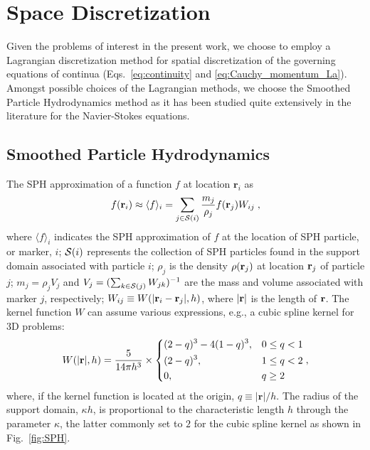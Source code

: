 \section{Space Discretization}\label{sec:Space-Discretization}
Given the problems of interest in the present work, we choose to employ a Lagrangian discretization method for spatial discretization of the governing equations of continua (Eqs.~\ref{eq:continuity} and \ref{eq:Cauchy_momentum_La}). Amongst possible choices of the Lagrangian methods, we choose the Smoothed Particle Hydrodynamics method as it has been studied quite extensively in the literature for the Navier-Stokes equations.
 
\subsection {Smoothed Particle Hydrodynamics}\label{sec:SPH}
The SPH  approximation of a function $f$ at location $\mathbf r_i$ as \cite{Monaghan2005a}
\begin{equation}\label{eq:SPH_f}
f(\mathbf r_i) \approx  \langle f\rangle_i= \sum_{j \in {{\mathcal{S}({i})}}} \frac{m_j}{\rho_j}f(\mathbf r_j)W_{ij} \; ,
\end{equation}
where $\langle f \rangle_i$ indicates the SPH approximation of $f$ at the location of SPH particle, or marker, $i$;  ${{\mathcal{S}({i})}}$ represents the collection of SPH particles found in the support domain associated with particle $i$; $\rho_j$ is the density $\rho({\bf r}_j)$ at location ${\bf r}_j$ of particle $j$; $m_j=\rho_j V_j$ and $V_j=(\sum_{k \in {\cal S}(j)} W_{jk})^{-1}$ are the mass and volume associated with marker $j$, respectively; $W_{ij}\equiv W(|\mathbf{r}_i-\mathbf{r}_j|,h)$, where $|{\bf r}|$ is the length of ${\bf r}$. The kernel function $W$ can assume various expressions, e.g., a cubic spline kernel for 3D problems:
\begin{equation} 
\label{eq:kernelExample}
W(|\mathbf{r}|,h) = \frac{5}{{14\pi {h^3}}} \times \left\{ \begin{aligned}
&{(2 - q)^3} - 4{(1 - q)^3}, && 0 \le q < 1 \\ 
&{(2 - q)^3}, && 1 \le q < 2 \\ 
&0, && q \ge 2 \\ 
\end{aligned} \right.,
\end{equation}
where, if the kernel function is located at the origin, $q\equiv | \mathbf{r} | / h$.  The radius of the support domain, $\kappa h$, is proportional to the characteristic length $h$ through the parameter $\kappa$, the latter commonly set to $2$ for the cubic spline kernel as shown in Fig.~\ref{fig:SPH}.
